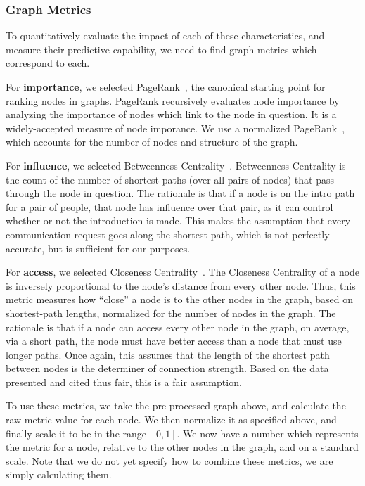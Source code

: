 \subsubsection{Graph Metrics}

To quantitatively evaluate the impact of each of these characteristics, and measure their predictive capability, we need to find graph metrics which correspond to each.

For \textbf{importance}, we selected PageRank~\cite{page1999pagerank}, the canonical starting point for ranking nodes in graphs. PageRank recursively evaluates node importance by analyzing the importance of nodes which link to the node in question. It is a widely-accepted measure of node imporance. We use a normalized PageRank~\cite{berberich2007comparing}, which accounts for the number of nodes and structure of the graph.

For \textbf{influence}, we selected Betweenness Centrality~\cite{10.2307/3033543}. Betweenness Centrality is the count of the number of shortest paths (over all pairs of nodes) that pass through the node in question. The rationale is that if a node is on the intro path for a pair of people, that node has influence over that pair, as it can control whether or not the introduction is made. This makes the assumption that every communication request goes along the shortest path, which is not perfectly accurate, but is sufficient for our purposes.

For \textbf{access}, we selected Closeness Centrality~\cite{FREEMAN1978215}. The Closeness Centrality of a node is inversely proportional to the node's distance from every other node. Thus, this metric measures how ``close'' a node is to the other nodes in the graph, based on shortest-path lengths, normalized for the number of nodes in the graph. The rationale is that if a node can access every other node in the graph, on average, via a short path, the node must have better access than a node that must use longer paths. Once again, this assumes that the length of the shortest path between nodes is the determiner of connection strength. Based on the data presented and cited thus fair, this is a fair assumption.

To use these metrics, we take the pre-processed graph above, and calculate the raw metric value for each node. We then normalize it as specified above, and finally scale it to be in the range $[0, 1]$. We now have a number which represents the metric for a node, relative to the other nodes in the graph, and on a standard scale. Note that we do not yet specify how to combine these metrics, we are simply calculating them.

